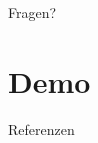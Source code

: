   \begin{frame}[standout]
    Fragen?
  \end{frame}

  \section{Demo}

  \appendix
  \begin{frame}[allowframebreaks]{Referenzen}
  \end{frame}


